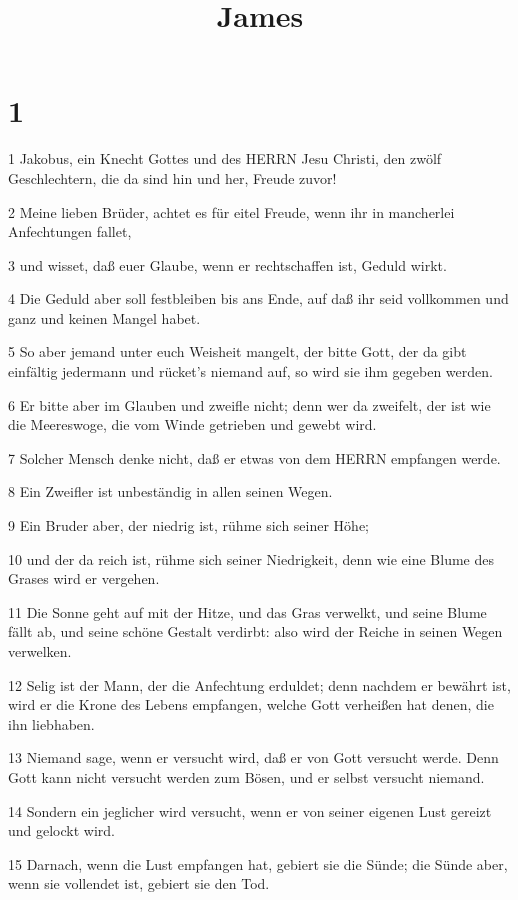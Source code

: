 

\title{James}


\chapter{1}

\par 1 Jakobus, ein Knecht Gottes und des HERRN Jesu Christi, den zwölf Geschlechtern, die da sind hin und her, Freude zuvor!
\par 2 Meine lieben Brüder, achtet es für eitel Freude, wenn ihr in mancherlei Anfechtungen fallet,
\par 3 und wisset, daß euer Glaube, wenn er rechtschaffen ist, Geduld wirkt.
\par 4 Die Geduld aber soll festbleiben bis ans Ende, auf daß ihr seid vollkommen und ganz und keinen Mangel habet.
\par 5 So aber jemand unter euch Weisheit mangelt, der bitte Gott, der da gibt einfältig jedermann und rücket's niemand auf, so wird sie ihm gegeben werden.
\par 6 Er bitte aber im Glauben und zweifle nicht; denn wer da zweifelt, der ist wie die Meereswoge, die vom Winde getrieben und gewebt wird.
\par 7 Solcher Mensch denke nicht, daß er etwas von dem HERRN empfangen werde.
\par 8 Ein Zweifler ist unbeständig in allen seinen Wegen.
\par 9 Ein Bruder aber, der niedrig ist, rühme sich seiner Höhe;
\par 10 und der da reich ist, rühme sich seiner Niedrigkeit, denn wie eine Blume des Grases wird er vergehen.
\par 11 Die Sonne geht auf mit der Hitze, und das Gras verwelkt, und seine Blume fällt ab, und seine schöne Gestalt verdirbt: also wird der Reiche in seinen Wegen verwelken.
\par 12 Selig ist der Mann, der die Anfechtung erduldet; denn nachdem er bewährt ist, wird er die Krone des Lebens empfangen, welche Gott verheißen hat denen, die ihn liebhaben.
\par 13 Niemand sage, wenn er versucht wird, daß er von Gott versucht werde. Denn Gott kann nicht versucht werden zum Bösen, und er selbst versucht niemand.
\par 14 Sondern ein jeglicher wird versucht, wenn er von seiner eigenen Lust gereizt und gelockt wird.
\par 15 Darnach, wenn die Lust empfangen hat, gebiert sie die Sünde; die Sünde aber, wenn sie vollendet ist, gebiert sie den Tod.
